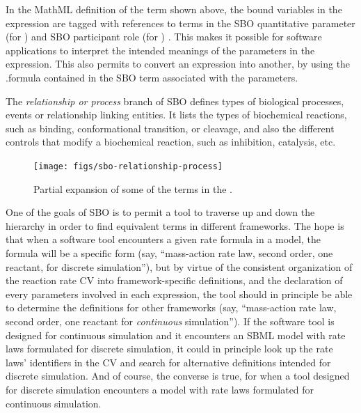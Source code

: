 \begin{blockChanged}
 In the MathML definition of the term shown above, the bound
variables in the  expression are tagged with
references to terms in the SBO quantitative parameter (for
) and SBO participant role (for ) .
This makes it possible for software applications to interpret the
intended meanings of the parameters in the expression. This also permits to convert an expression into another, by using the \mathmltwo.formula contained in the SBO term associated with the parameters.

The \emph{relationship or process} branch of SBO defines types of biological processes, events or relationship linking entities.  It
lists the types of biochemical reactions, such as binding,
conformational transition, or cleavage, and also the different
controls that modify a biochemical reaction, such as inhibition,
catalysis, etc.
\end{blockChanged}

\begin{figure}[tbh]
  \centering
  \texttt{[image: figs/sbo-relationship-process]}
  \caption{Partial expansion of some of the terms in the .}
  \label{fig:sbo-event}
\end{figure}
\begin{blockChanged}
One of the goals of SBO is to permit a tool to traverse up and
down the hierarchy in order to find equivalent terms in different
frameworks.  The hope is that when a software tool encounters a
given rate formula in a model, the formula will be a specific form
(say, ``mass-action rate law, second order, one reactant, for
discrete simulation''), but by virtue of the consistent
organization of the reaction rate CV into framework-specific
definitions, and the declaration of every parameters involved in each expression, the tool should in principle be able to determine the
definitions for other frameworks (say, ``mass-action rate law,
second order, one reactant for \emph{continuous} simulation'').
If the software tool is designed for continuous simulation and it
encounters an SBML model with rate laws formulated for discrete
simulation, it could in principle look up the rate laws'
identifiers in the CV and search for alternative definitions
intended for discrete simulation.  And of course, the converse is
true, for when a tool designed for discrete simulation encounters
a model with rate laws formulated for continuous simulation.
\end{blockChanged}
